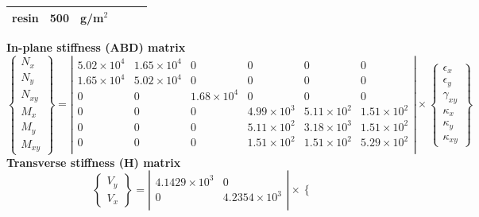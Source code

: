 \documentclass[a4paper,landscape,oneside,11pt,twocolumn]{memoir}
\begin{document}
\begin{table}[!htbp]
\begin{tabular}[t]{rrlrrl}
      resin & 500 & g/m$^2$\\
      \bottomrule
    \end{tabular}
  \vbox{
    \vbox{\small\textbf{In-plane stiffness (ABD) matrix}\\[-3mm]
      \tiny\[\left\{\begin{array}{c}
          N_x\\ N_y\\ N_{xy}\\ M_x\\ M_y\\ M_{xy}
        \end{array}\right\} = 
      \left|\begin{array}{cccccc}
           5.02\times 10^{4} &  1.65\times 10^{4} & 0 & 0 & 0 & 0\\
           1.65\times 10^{4} &  5.02\times 10^{4} & 0 & 0 & 0 & 0\\
          0 & 0 &  1.68\times 10^{4} & 0 & 0 & 0\\
          0 & 0 & 0 &  4.99\times 10^{3} &  5.11\times 10^{2} &  1.51\times 10^{2}\\
          0 & 0 & 0 &  5.11\times 10^{2} &  3.18\times 10^{3} &  1.51\times 10^{2}\\
          0 & 0 & 0 &  1.51\times 10^{2} &  1.51\times 10^{2} &  5.29\times 10^{2}\\
          \end{array}\right| \times
        \left\{\begin{array}{c}
            \epsilon_x\\[2pt] \epsilon_y\\[2pt] \gamma_{xy}\\[2pt]
            \kappa_x\\[2pt] \kappa_y\\[2pt] \kappa_{xy}
          \end{array}\right\}\]
    }
    \vbox{\small\textbf{Transverse stiffness (H) matrix}\\[-2mm]
      \tiny\[\left\{\begin{array}{c}
          V_y\\ V_x
        \end{array}\right\} = 
      \left|\begin{array}{cc}
           4.1429\times 10^{3} & 0\\
          0 &  4.2354\times 10^{3}\\
          \end{array}\right| \times
        \left\{\begin{array}{c}

\end{array}\]}}
\end{table}
\end{document}
